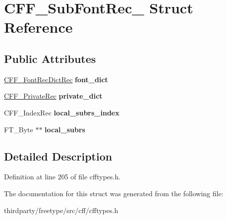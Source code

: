 \hypertarget{struct_c_f_f___sub_font_rec__}{}\section{C\+F\+F\+\_\+\+Sub\+Font\+Rec\+\_\+ Struct Reference}
\label{struct_c_f_f___sub_font_rec__}
\subsection*{Public Attributes}
\begin{DoxyCompactItemize}
\item 
\mbox{\label{struct_c_f_f___sub_font_rec___af23b698ce981c661db031c834475ddb2}} 
\hyperlink{struct_c_f_f___font_rec_dict_rec__}{C\+F\+F\+\_\+\+Font\+Rec\+Dict\+Rec} {\bfseries font\+\_\+dict}
\item 
\mbox{\label{struct_c_f_f___sub_font_rec___abdfa5a7b7bf4e40ca1ddef7decaae281}} 
\hyperlink{struct_c_f_f___private_rec__}{C\+F\+F\+\_\+\+Private\+Rec} {\bfseries private\+\_\+dict}
\item 
\mbox{\label{struct_c_f_f___sub_font_rec___a7ad534c23d38686ce2dec15f1a5bfc67}} 
C\+F\+F\+\_\+\+Index\+Rec {\bfseries local\+\_\+subrs\+\_\+index}
\item 
\mbox{\label{struct_c_f_f___sub_font_rec___a66ff81703fc8280ac33c40b8d5765ed2}} 
F\+T\+\_\+\+Byte $\ast$$\ast$ {\bfseries local\+\_\+subrs}
\end{DoxyCompactItemize}


\subsection{Detailed Description}


Definition at line 205 of file cfftypes.\+h.



The documentation for this struct was generated from the following file\+:\begin{DoxyCompactItemize}
\item 
thirdparty/freetype/src/cff/cfftypes.\+h\end{DoxyCompactItemize}

